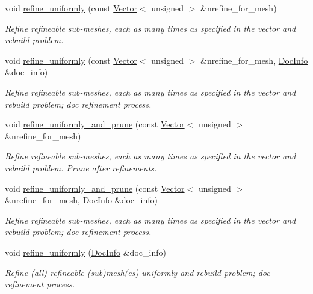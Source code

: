 \begin{DoxyCompactItemize}
void \hyperlink{classoomph_1_1Problem_a181fa92838f77bd6b12b531dca222c41}{refine\+\_\+uniformly} (const \hyperlink{classoomph_1_1Vector}{Vector}$<$ unsigned $>$ \&nrefine\+\_\+for\+\_\+mesh)
\begin{DoxyCompactList}\small\item\em Refine refineable sub-\/meshes, each as many times as specified in the vector and rebuild problem. \end{DoxyCompactList}\item 
void \hyperlink{classoomph_1_1Problem_a14ca1d18e9aa569a6417c45eef70d3ff}{refine\+\_\+uniformly} (const \hyperlink{classoomph_1_1Vector}{Vector}$<$ unsigned $>$ \&nrefine\+\_\+for\+\_\+mesh, \hyperlink{classoomph_1_1DocInfo}{Doc\+Info} \&doc\+\_\+info)
\begin{DoxyCompactList}\small\item\em Refine refineable sub-\/meshes, each as many times as specified in the vector and rebuild problem; doc refinement process. \end{DoxyCompactList}\item 
void \hyperlink{classoomph_1_1Problem_a3930fc0977bdc33f52100e53f5d878d7}{refine\+\_\+uniformly\+\_\+and\+\_\+prune} (const \hyperlink{classoomph_1_1Vector}{Vector}$<$ unsigned $>$ \&nrefine\+\_\+for\+\_\+mesh)
\begin{DoxyCompactList}\small\item\em Refine refineable sub-\/meshes, each as many times as specified in the vector and rebuild problem. Prune after refinements. \end{DoxyCompactList}\item 
void \hyperlink{classoomph_1_1Problem_adea5168244acebb539fa29e36182ced3}{refine\+\_\+uniformly\+\_\+and\+\_\+prune} (const \hyperlink{classoomph_1_1Vector}{Vector}$<$ unsigned $>$ \&nrefine\+\_\+for\+\_\+mesh, \hyperlink{classoomph_1_1DocInfo}{Doc\+Info} \&doc\+\_\+info)
\begin{DoxyCompactList}\small\item\em Refine refineable sub-\/meshes, each as many times as specified in the vector and rebuild problem; doc refinement process. \end{DoxyCompactList}\item 
void \hyperlink{classoomph_1_1Problem_ae4ccf79fde59556d93af947618b6c80b}{refine\+\_\+uniformly} (\hyperlink{classoomph_1_1DocInfo}{Doc\+Info} \&doc\+\_\+info)
\begin{DoxyCompactList}\small\item\em Refine (all) refineable (sub)mesh(es) uniformly and rebuild problem; doc refinement process. \end{DoxyCompactList}\item 

\end{DoxyCompactItemize}
